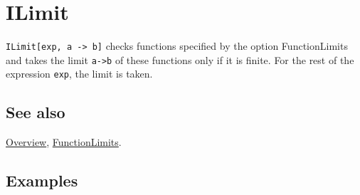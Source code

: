 \documentclass[../FeynCalcManual.tex]{subfiles}
\begin{document}
\hypertarget{ilimit}{%
\section{ILimit}\label{ilimit}}

\texttt{ILimit[\allowbreak{}exp,\ \allowbreak{}a -> b]} checks functions
specified by the option FunctionLimits and takes the limit \texttt{a->b}
of these functions only if it is finite. For the rest of the expression
\texttt{exp}, the limit is taken.

\subsection{See also}

\hyperlink{toc}{Overview}, \hyperlink{functionlimits}{FunctionLimits}.

\subsection{Examples}
\end{document}
